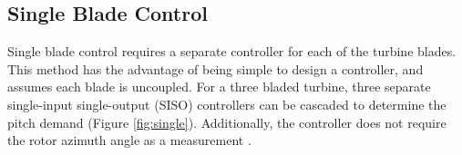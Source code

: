 \subsection{Single Blade Control}
Single blade control requires a separate controller for each of the turbine blades. This method has the advantage of being simple to design a controller, and assumes each blade is uncoupled. For a three bladed turbine, three separate single-input single-output (SISO) controllers can be cascaded to determine the pitch demand (Figure \ref{fig:single}). Additionally, the controller does not require the rotor azimuth angle as a measurement \citep{19_Lio}.


